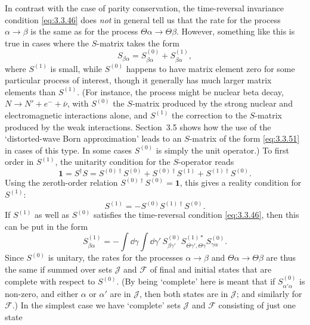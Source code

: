 In contrast with the case of parity conservation, the time-reversal invariance
condition \eqref{eq:3.3.46} does \textit{not} in general tell us that the rate for the
process $\alpha\to\beta$ is the same as for the process
$\Theta\alpha\to\Theta\beta$. However, something like this is true in cases where
the $S$-matrix takes the form
\begin{equation}
S_{\beta\alpha}=S^{(0)}_{\beta\alpha}+S^{(1)}_{\beta\alpha},
\tag{3.3.51}\label{eq:3.3.51}
\end{equation}
where $S^{(1)}$ is small, while $S^{(0)}$ happens to have matrix element zero for
some particular process of interest, though it generally has much larger matrix
elements than $S^{(1)}$. (For instance, the process might be nuclear beta decay,
$N\to N'+e^-+\bar\nu$, with $S^{(0)}$ the $S$-matrix produced by the strong nuclear
and electromagnetic interactions alone, and $S^{(1)}$ the correction to the
$S$-matrix produced by the weak interactions. Section~3.5 shows how the use of the
`distorted-wave Born approximation' leads to an $S$-matrix of the form \eqref{eq:3.3.51} in
cases of this type. In some cases $S^{(0)}$ is simply the unit operator.) To first
order in $S^{(1)}$, the unitarity condition for the $S$-operator reads
\[
\mathbf{1}=S^\dagger S
=S^{(0)\dagger}S^{(0)}+S^{(0)\dagger}S^{(1)}+S^{(1)\dagger}S^{(0)}.
\]
Using the zeroth-order relation $S^{(0)\dagger}S^{(0)}=\mathbf{1}$, this gives a
reality condition for $S^{(1)}$:
\begin{equation}
S^{(1)}=-S^{(0)}S^{(1)\dagger}S^{(0)}.
\tag{3.3.52}\label{eq:3.3.52}
\end{equation}
If $S^{(1)}$ as well as $S^{(0)}$ satisfies the time-reversal condition \eqref{eq:3.3.46},
then this can be put in the form
\begin{equation}
S^{(1)}_{\beta\alpha}=-\int \dd\gamma\int \dd\gamma'\,
S^{(0)}_{\beta\gamma'}S^{(1)*}_{\Theta\gamma',\Theta\gamma}
S^{(0)}_{\gamma\alpha}.
\tag{3.3.53}\label{eq:3.3.53}
\end{equation}
Since $S^{(0)}$ is unitary, the rates for the processes $\alpha\to\beta$ and
$\Theta\alpha\to\Theta\beta$ are thus the same if summed over sets $\mathcal{J}$
and $\mathcal{F}$ of final and initial states that are complete with respect to
$S^{(0)}$. (By being `complete' here is meant that if $S^{(0)}_{\alpha'\alpha}$ is
non-zero, and either $\alpha$ or $\alpha'$ are in $\mathcal{J}$, then both states
are in $\mathcal{J}$; and similarly for $\mathcal{F}$.) In the simplest case we
have `complete' sets $\mathcal{J}$ and $\mathcal{F}$ consisting of just one state
